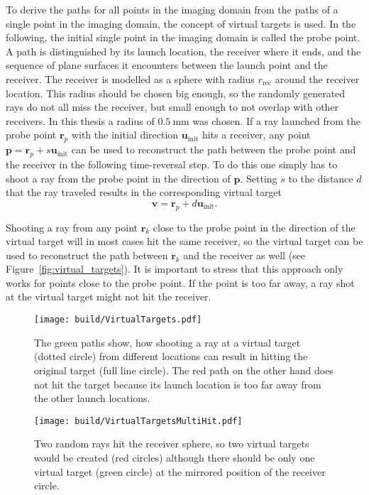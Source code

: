 To derive the paths for all points in the imaging domain from the paths of a single point in the imaging domain, the concept of virtual targets is used.
In the following, the initial single point in the imaging domain is called the probe point.
A path is distinguished by its launch location, the receiver where it ends, and the sequence of plane surfaces it encounters between the launch point and the receiver.
The receiver is modelled as a sphere with radius \(r_{\text{rec}}\) around the receiver location.
This radius should be chosen big enough, so the randomly generated rays do not all miss the receiver, but small enough to not overlap with other receivers.
In this thesis a radius of \(\SI{0.5}{\milli\meter}\) was chosen.
If a ray launched from the probe point \(\bm{r}_p\) with the initial direction \(\bm{u}_{\text{init}}\) hits a receiver, any point \(\bm{p} = \bm{r}_p + s \bm{u}_{\text{init}}\) can be used to reconstruct the path between the probe point and the receiver in the following time-reversal step.
To do this one simply has to shoot a ray from the probe point in the direction of \(\bm{p}\).
Setting \(s\) to the distance \(d\) that the ray traveled results in the corresponding virtual target
\begin{equation}\label{eq:visual_target}
    \bm{v} = \bm{r}_p + d \bm{u}_{\text{init}}.
\end{equation}

Shooting a ray from any point \(\bm{r}_k\) close to the probe point in the direction of the virtual target will in most cases hit the same receiver, so the virtual target can be used to reconstruct the path between \(\bm{r}_k\) and the receiver as well  (see Figure~\ref{fig:virtual_targets}).
It is important to stress that this approach only works for points close to the probe point.
If the point is too far away, a ray shot at the virtual target might not hit the receiver.

\begin{figure}[H]
    \centering
    \texttt{[image: build/VirtualTargets.pdf]}
    \caption{The green paths show, how shooting a ray at a virtual target (dotted circle) from different locations can result in hitting the original target (full line circle). The red path on the other hand does not hit the target because its launch location is too far away from the other launch locations.}\label{fig:virtual_targets}
    \vspace{2mm}
    \texttt{[image: build/VirtualTargetsMultiHit.pdf]}
    \caption{Two random rays hit the receiver sphere, so two virtual targets would be created (red circles) although there should be only one virtual target (green circle) at the mirrored position of the receiver circle.}\label{fig:mulithit}
\end{figure}

